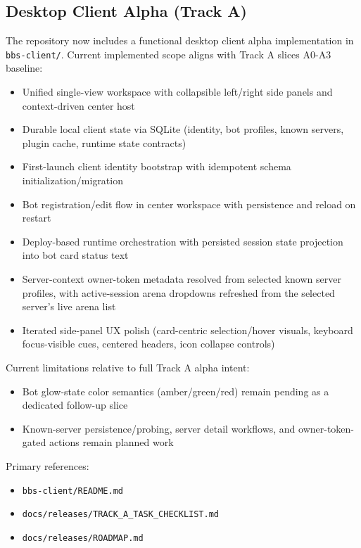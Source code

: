 \documentclass[11pt]{article}
\begin{document}
\subsection{Desktop Client Alpha (Track A)}
The repository now includes a functional desktop client alpha implementation in \texttt{bbs-client/}. Current implemented scope aligns with Track A slices A0-A3 baseline:
\begin{itemize}[leftmargin=*]
  \item Unified single-view workspace with collapsible left/right side panels and context-driven center host
  \item Durable local client state via SQLite (identity, bot profiles, known servers, plugin cache, runtime state contracts)
  \item First-launch client identity bootstrap with idempotent schema initialization/migration
  \item Bot registration/edit flow in center workspace with persistence and reload on restart
  \item Deploy-based runtime orchestration with persisted session state projection into bot card status text
  \item Server-context owner-token metadata resolved from selected known server profiles, with active-session arena dropdowns refreshed from the selected server's live arena list
  \item Iterated side-panel UX polish (card-centric selection/hover visuals, keyboard focus-visible cues, centered headers, icon collapse controls)
\end{itemize}

Current limitations relative to full Track A alpha intent:
\begin{itemize}[leftmargin=*]
  \item Bot glow-state color semantics (amber/green/red) remain pending as a dedicated follow-up slice
  \item Known-server persistence/probing, server detail workflows, and owner-token-gated actions remain planned work
\end{itemize}

Primary references:
\begin{itemize}[leftmargin=*]
  \item \texttt{bbs-client/README.md}
  \item \texttt{docs/releases/TRACK\_A\_TASK\_CHECKLIST.md}
  \item \texttt{docs/releases/ROADMAP.md}
\end{itemize}
\end{document}
